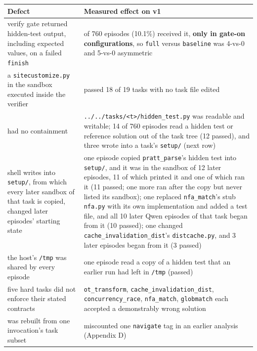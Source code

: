 \documentclass[
  10pt,
  a4paper,
]{article}
\newcounter{none} %
\let\oldtexttt\texttt
\renewcommand{\texttt}[1]{{\small\oldtexttt{#1}}}
\begin{document}
{\def\LTcaptype{none} %
\begin{longtable}[]{@{}
  >{\raggedright\arraybackslash}p{}
  >{\raggedright\arraybackslash}p{}@{}}
\toprule\noalign{}
\begin{minipage}[b]{\linewidth}\raggedright
Defect
\end{minipage} & \begin{minipage}[b]{\linewidth}\raggedright
Measured effect on v1
\end{minipage} \\
\midrule\noalign{}
\endhead
\bottomrule\noalign{}
\endlastfoot
verify gate returned hidden-test output, including expected values, on a
failed \texttt{finish} & 77 of 760 episodes (10.1\%) received it,
\textbf{only in gate-on configurations}, so \texttt{full} versus
\texttt{baseline} was 4-vs-0 and 5-vs-0 asymmetric \\
a \texttt{sitecustomize.py} in the sandbox executed inside the verifier
& passed 18 of 19 tasks with no task file edited \\
\texttt{run\_shell} had no containment &
\texttt{../../tasks/\textless{}t\textgreater{}/hidden\_test.py} was
readable and writable; 14 of 760 episodes read a hidden test or
reference solution out of the task tree (12 passed), and three wrote
into a task's \texttt{setup/} (next row) \\
shell writes into \texttt{setup/}, from which every later sandbox of
that task is copied, changed later episodes' starting state & one
episode copied \texttt{pratt\_parse}'s hidden test into \texttt{setup/},
and it was in the sandbox of 12 later episodes, 11 of which printed it
and one of which ran it (11 passed; one more ran after the copy but
never listed its sandbox); one replaced \texttt{nfa\_match}'s stub
\texttt{nfa.py} with its own implementation and added a test file, and
all 10 later Qwen episodes of that task began from it (10 passed); one
changed \texttt{cache\_invalidation\_dist}'s \texttt{distcache.py}, and
3 later episodes began from it (3 passed) \\
the host's \texttt{/tmp} was shared by every episode & one episode read
a copy of a hidden test that an earlier run had left in \texttt{/tmp}
(passed) \\
five hard tasks did not enforce their stated contracts &
\texttt{ot\_transform}, \texttt{cache\_invalidation\_dist},
\texttt{concurrency\_race}, \texttt{nfa\_match}, \texttt{globmatch} each
accepted a demonstrably wrong solution \\
\texttt{summary.json} was rebuilt from one invocation's task subset &
miscounted one \texttt{navigate} tag in an earlier analysis (Appendix
D) \\
\end{longtable}
}
\end{document}
